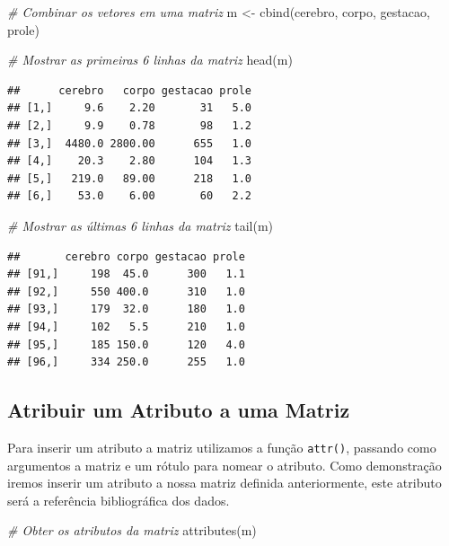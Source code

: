\documentclass[
]{article}
\newenvironment{Shaded}{\begin{snugshade}}{\end{snugshade}}
\newcommand{\CommentTok}[1]{\textcolor[rgb]{0.56,0.35,0.01}{\textit{#1}}}
\newcommand{\FunctionTok}[1]{\textcolor[rgb]{0.00,0.00,0.00}{#1}}
\newcommand{\NormalTok}[1]{#1}
\newcommand{\OtherTok}[1]{\textcolor[rgb]{0.56,0.35,0.01}{#1}}
\begin{document}
\begin{Shaded}
\begin{Highlighting}[]
\CommentTok{\# Combinar os vetores em uma matriz}
\NormalTok{m }\OtherTok{\textless{}{-}} \FunctionTok{cbind}\NormalTok{(cerebro, corpo, gestacao, prole)}

\CommentTok{\# Mostrar as primeiras 6 linhas da matriz}
\FunctionTok{head}\NormalTok{(m)}
\end{Highlighting}
\end{Shaded}

\begin{verbatim}
##      cerebro   corpo gestacao prole
## [1,]     9.6    2.20       31   5.0
## [2,]     9.9    0.78       98   1.2
## [3,]  4480.0 2800.00      655   1.0
## [4,]    20.3    2.80      104   1.3
## [5,]   219.0   89.00      218   1.0
## [6,]    53.0    6.00       60   2.2
\end{verbatim}

\begin{Shaded}
\begin{Highlighting}[]
\CommentTok{\# Mostrar as últimas 6 linhas da matriz}
\FunctionTok{tail}\NormalTok{(m)}
\end{Highlighting}
\end{Shaded}

\begin{verbatim}
##       cerebro corpo gestacao prole
## [91,]     198  45.0      300   1.1
## [92,]     550 400.0      310   1.0
## [93,]     179  32.0      180   1.0
## [94,]     102   5.5      210   1.0
## [95,]     185 150.0      120   4.0
## [96,]     334 250.0      255   1.0
\end{verbatim}

\hypertarget{atribuir-um-atributo-a-uma-matriz}{%
\subsection{Atribuir um Atributo a uma
Matriz}\label{atribuir-um-atributo-a-uma-matriz}}

Para inserir um atributo a matriz utilizamos a função \texttt{attr()},
passando como argumentos a matriz e um rótulo para nomear o atributo.
Como demonstração iremos inserir um atributo a nossa matriz definida
anteriormente, este atributo será a referência bibliográfica dos dados.

\begin{Shaded}
\begin{Highlighting}[]
\CommentTok{\# Obter os atributos da matriz}
\FunctionTok{attributes}\NormalTok{(m)}
\end{Highlighting}
\end{Shaded}
\end{document}

